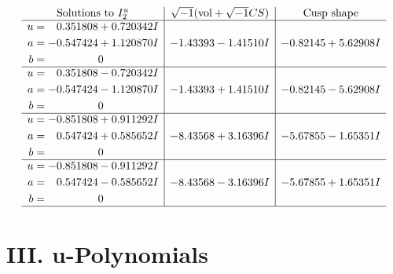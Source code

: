 \documentclass[1p]{elsarticle_modified}
\theoremstyle{definition}
\newcommand{\I}{\sqrt{-1}}
\begin{document}
$$\begin{array}{c|c|c}  
\text{Solutions to }I^u_{2}& \I (\text{vol} + \sqrt{-1}CS) & \text{Cusp shape}\\
 \hline 
\begin{aligned}
u &= \phantom{-}0.351808 + 0.720342 I \\
a &= -0.547424 + 1.120870 I \\
b &= \phantom{-0.000000 } 0\end{aligned}
 & -1.43393 - 1.41510 I & -0.82145 + 5.62908 I \\ \hline\begin{aligned}
u &= \phantom{-}0.351808 - 0.720342 I \\
a &= -0.547424 - 1.120870 I \\
b &= \phantom{-0.000000 } 0\end{aligned}
 & -1.43393 + 1.41510 I & -0.82145 - 5.62908 I \\ \hline\begin{aligned}
u &= -0.851808 + 0.911292 I \\
a &= \phantom{-}0.547424 + 0.585652 I \\
b &= \phantom{-0.000000 } 0\end{aligned}
 & -8.43568 + 3.16396 I & -5.67855 - 1.65351 I \\ \hline\begin{aligned}
u &= -0.851808 - 0.911292 I \\
a &= \phantom{-}0.547424 - 0.585652 I \\
b &= \phantom{-0.000000 } 0\end{aligned}
 & -8.43568 - 3.16396 I & -5.67855 + 1.65351 I\\
 \hline 
 \end{array}$$\newpage
\newpage\renewcommand{\arraystretch}{1}
\centering \section*{ III. u-Polynomials}
\end{document}
